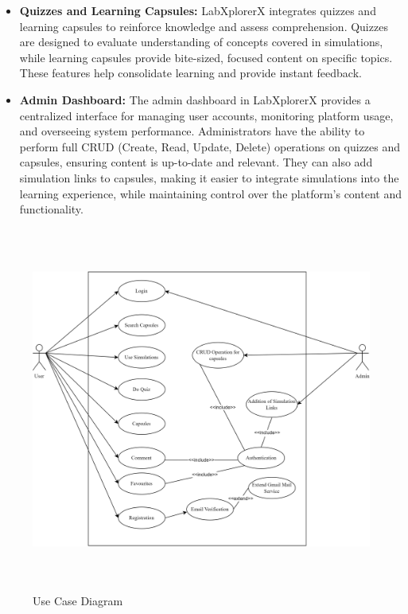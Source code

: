 \begin{itemize}
    \item \textbf{Quizzes and Learning Capsules:} LabXplorerX integrates quizzes and learning capsules to reinforce knowledge and assess comprehension. Quizzes are designed to evaluate understanding of concepts covered in simulations, while learning capsules provide bite-sized, focused content on specific topics. These features help consolidate learning and provide instant feedback.

    \item \textbf{Admin Dashboard:}  
    The admin dashboard in LabXplorerX provides a centralized interface for managing user accounts, monitoring platform usage, and overseeing system performance. Administrators have the ability to perform full CRUD (Create, Read, Update, Delete) operations on quizzes and capsules, ensuring content is up-to-date and relevant. They can also add simulation links to capsules, making it easier to integrate simulations into the learning experience, while maintaining control over the platform's content and functionality.

\end{itemize}

\begin{figure}[H]
    \centering
     \includegraphics[height = 12cm]{Diagrams/use_case.png}
     \caption{Use Case Diagram}
 \end{figure}

